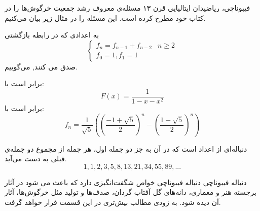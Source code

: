 فیبوناچی، ریاضیدان ایتالیایی قرن ۱۳ ‌مسئله‌ی معروف رشد جمعیت خرگوش‌ها را در کتاب خود مطرح کرده است.
این مسئله را در مثال زیر بیان می‌کنیم.



    
\begin{DEFINITION}
    به اعدادی که در رابطه بازگشتی
  \[\begin{cases}
      f_{n}=f_{n-1} + f_{n-2} & n\geq 2 \\
      
      f_0=1 ,
      f_1 = 1
  \end{cases}
  \]
  صدق می کنند,
    می‌گوییم.
\end{DEFINITION}




\begin{THEOREM}
    \p
    برابر است با:
    $$F(x) = \frac{1}{1 - x - x^2}$$
    برابر است با:
    $$f_n = \frac{1}{\sqrt{5}}((\frac{-1 + \sqrt{5}}{2})^{n} - (\frac{1 - \sqrt{5}}{2})^{n})$$
\end{THEOREM}




\begin{DEFINITION}
    \p
    دنباله‌ای از اعداد است که در آن به جز دو جمله اول، هر جمله از مجموع دو جمله‌ی قبلی به دست می‌آید.
    \p
  $$1, 1, 2, 3, 5, 8, 13, 21, 34, 55, 89, ...$$
	\p 
\end{DEFINITION}

\begin{EXTRA}{دنباله فیبوناچی}
  \p
دنباله فیبوناچی خواص شگفت‌انگیزی دارد که باعث می شود در آثار برجسته هنر و معماری، دانه‌های گل آفتاب گردان، صدف‌ها و تولید مثل خرگوش‌ها، آثار آن دیده شود. به زودی مطالب بیش‌تری در این قسمت قرار خواهد گرفت.
\end{EXTRA}